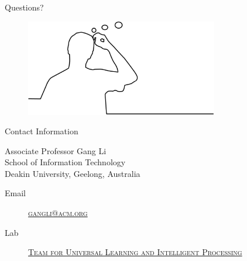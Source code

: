 \documentclass[
 size=14pt,
 paper=smartboard,  %
 mode=present, 		%
 display=slides, 	%
 pauseslide,
 fleqn,leqno]{powerdot}{}
\begin{document}
%
\begin{slide}[toc=,bm=]{Questions?}
\begin{center}
\vspace{2cm}
\begin{figure}
    \includegraphics[width=0.75\textwidth]{figures//theme3//question.eps}
\end{figure}
\end{center}
\end{slide}


\begin{wideslide}[toc=,bm=]{Contact Information}
\centering
{}
\twocolumn[
lcolwidth=0.35\linewidth,
rcolwidth=0.65\linewidth
]
{
}
{
Associate Professor Gang Li\\
School of Information Technology\\
Deakin University, Geelong, Australia
\begin{description}
 \item[Email] \href{mailto:gangli@acm.org}
 {\textsc{\footnotesize{gangli@acm.org}}}

 \item[Lab] \href{http://www.tulip.org.au}
 {\textsc{\footnotesize{Team for Universal Learning and Intelligent Processing}}}
\end{description}
}
\end{wideslide}
\end{document}
